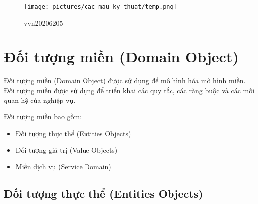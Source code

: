 \begin{figure}[H]

    \centering

    \texttt{[image: pictures/cac\_mau\_ky\_thuat/temp.png]}

    \caption{vvn20206205}

\end{figure}














\section{Đối tượng miền (Domain Object)}

Đối tượng miền (Domain Object) được sử dụng để mô hình hóa mô hình miền. Đối tượng miền được sử dụng để triển khai các quy tắc, các ràng buộc và các mối quan hệ của nghiệp vụ.

Đối tượng miền bao gồm:

\begin{itemize}

    \item Đối tượng thực thể (Entities Objects)

    \item Đối tượng giá trị (Value Objects)

    \item Miền dịch vụ (Service Domain)

\end{itemize}

\subsection{Đối tượng thực thể (Entities Objects)}

